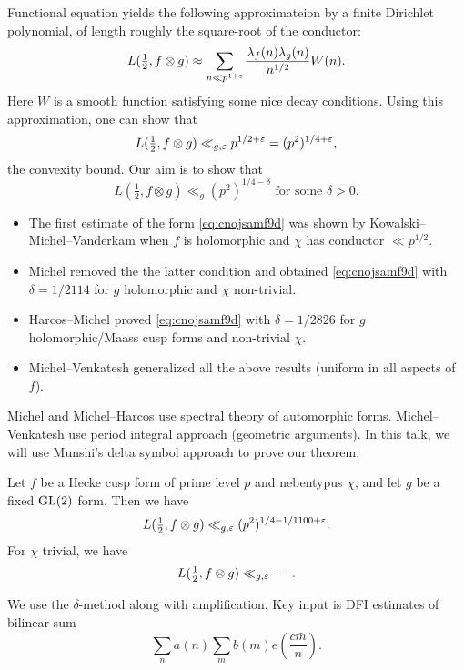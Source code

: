 \documentclass[reqno]{amsart} 
\begin{document}
Functional equation yields the following approximateion by a finite Dirichlet polynomial, of length roughly the square-root of the conductor:
\begin{equation*}
  L(\tfrac{1}{2}, f \otimes g) \approx \sum_{n \ll p^{1 + \varepsilon}}
  \frac{\lambda_f(n) \lambda_g(n)}{ n^{1/2}} W(n).
\end{equation*}
Here $W$ is a smooth function satisfying some nice decay conditions.  Using this approximation, one can show that
\begin{equation*}
  L(\tfrac{1}{2}, f \otimes g) \ll_{g, \varepsilon} p^{1/2 + \varepsilon} =
  (p^2)^{1/4 + \varepsilon},
\end{equation*}
the convexity bound.  Our aim is to show that
\begin{equation}\label{eq:cnojsamf9d}
  L(\tfrac{1}{2}, f \otimes g) \ll_g(p^2)^{1/4 - \delta} \text{ for some } \delta > 0.
\end{equation}
\begin{itemize}
\item The first estimate of the form \eqref{eq:cnojsamf9d} was shown by Kowalski--Michel--Vanderkam \cite{KMV02} when $f$ is holomorphic and $\chi$ has conductor $\ll p^{1/2}$.  
\item Michel \cite{Mi04} removed the the latter condition and obtained \eqref{eq:cnojsamf9d} with $\delta = 1/2114$ for $g$ holomorphic and $\chi$ non-trivial.  
\item Harcos--Michel \cite{MR2207235} proved \eqref{eq:cnojsamf9d} with $\delta = 1/2826$ for $g$ holomorphic/Maass cusp forms and non-trivial $\chi$.
\item Michel--Venkatesh \cite{michel-2009} generalized all the above results (uniform in all aspects of $f$).
\end{itemize}
Michel and Michel--Harcos use spectral theory of automorphic forms.  Michel--Venkatesh use period integral approach (geometric arguments).  In this talk, we will use Munshi's delta symbol approach to prove our theorem.

\begin{theorem}
  Let $f$ be a Hecke cusp form of prime level $p$ and nebentypus $\chi$, and let $g$ be a fixed $\operatorname{GL}(2)$ form.  Then we have
  \begin{equation*}
    L(\tfrac{1}{2}, f \otimes g) \ll_{g, \varepsilon}(p^2)^{1/4 - 1/1100 + \varepsilon}.
  \end{equation*}
  For $\chi$ trivial, we have
  \begin{equation*}
    L(\tfrac{1}{2}, f \otimes g) \ll_{g, \varepsilon} \dotsb.
  \end{equation*}
\end{theorem}
We use the $\delta$-method along with amplification.  Key input is DFI estimates of bilinear sum
\begin{equation*}
  \sum_n a(n) \sum_{m} b(m)
  e \left( \frac{c \bar{m}}{n} \right).
\end{equation*}
\end{document}
